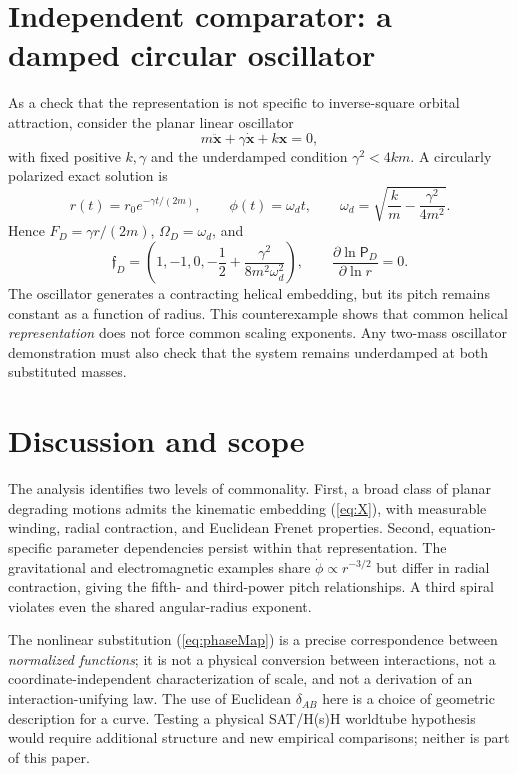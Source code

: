 \documentclass[aps,prd,reprint,onecolumn,superscriptaddress,nofootinbib]{revtex4-2}
\newcommand{\PiH}{\mathsf P}
\begin{document}
\section{Independent comparator: a damped circular oscillator}
As a check that the representation is not specific to inverse-square orbital attraction, consider the planar linear oscillator
\begin{equation}
 m\ddot{\bm x}+\gamma\dot{\bm x}+k\bm x=0,
\end{equation}
with fixed positive $k,\gamma$ and the underdamped condition $\gamma^2<4km$. A circularly polarized exact solution is
\begin{equation}
 r(t)=r_0e^{-\gamma t/(2m)},\qquad
 \phi(t)=\omega_dt,\qquad
 \omega_d=\sqrt{\frac{k}{m}-\frac{\gamma^2}{4m^2}}.
\end{equation}
Hence $F_D=\gamma r/(2m)$, $\Omega_D=\omega_d$, and
\begin{equation}
 \bm{\mathfrak f}_D=\left(1,-1,0,-\frac12+\frac{\gamma^2}{8m^2\omega_d^2}\right),\qquad
 \frac{\partial\ln\PiH_D}{\partial\ln r}=0.
\end{equation}
The oscillator generates a contracting helical embedding, but its pitch remains constant as a function of radius. This counterexample shows that common helical \emph{representation} does not force common scaling exponents. Any two-mass oscillator demonstration must also check that the system remains underdamped at both substituted masses.

\section{Discussion and scope}
The analysis identifies two levels of commonality. First, a broad class of planar degrading motions admits the kinematic embedding (\ref{eq:X}), with measurable winding, radial contraction, and Euclidean Frenet properties. Second, equation-specific parameter dependencies persist within that representation. The gravitational and electromagnetic examples share $\dot\phi\propto r^{-3/2}$ but differ in radial contraction, giving the fifth- and third-power pitch relationships. A third spiral violates even the shared angular-radius exponent.

The nonlinear substitution (\ref{eq:phaseMap}) is a precise correspondence between \emph{normalized functions}; it is not a physical conversion between interactions, not a coordinate-independent characterization of scale, and not a derivation of an interaction-unifying law. The use of Euclidean $\delta_{AB}$ here is a choice of geometric description for a curve. Testing a physical SAT/H(s)H worldtube hypothesis would require additional structure and new empirical comparisons; neither is part of this paper.
\end{document}
